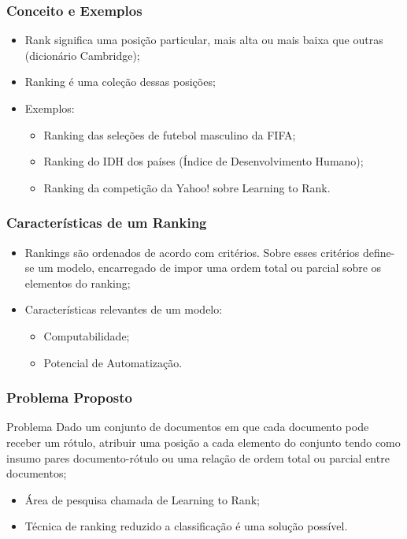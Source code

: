 \begin{frame}
    \frametitle{Conceito e Exemplos}

    \begin{itemize}
        \item Rank significa uma posição particular, mais alta ou mais baixa que outras (dicionário Cambridge);
    
        \item Ranking é uma coleção dessas posições;
    
        \item Exemplos:

        \begin{itemize}
            \item Ranking das seleções de futebol masculino da FIFA;
            \item Ranking do IDH dos países (Índice de Desenvolvimento Humano);
            \item Ranking da competição da Yahoo! sobre Learning to Rank.
        \end{itemize}
    \end{itemize}
\end{frame}

\begin{frame}
    \frametitle{Características de um Ranking}

    \begin{itemize}
        \item Rankings são ordenados de acordo com critérios. Sobre esses critérios define-se um modelo, encarregado de impor uma ordem total ou parcial sobre os elementos do ranking;

        \item Características relevantes de um modelo:

        \begin{itemize}
            \item Computabilidade;
            \item Potencial de Automatização.
        \end{itemize}
    \end{itemize}
\end{frame}

\begin{frame}
    \frametitle{Problema Proposto}

    \begin{block}{Problema}
        Dado um conjunto de documentos em que cada documento pode receber um rótulo, atribuir uma posição a cada elemento do conjunto tendo como insumo pares documento-rótulo ou uma relação de ordem total ou parcial entre documentos;
    \end{block}

    \begin{itemize}
        \item Área de pesquisa chamada de Learning to Rank;
        \item Técnica de ranking reduzido a classificação é uma solução possível.
    \end{itemize}
\end{frame}